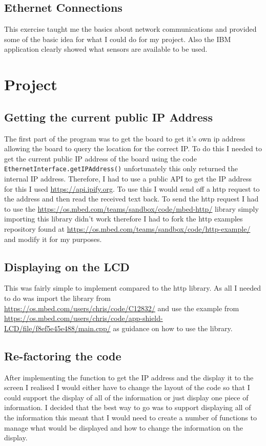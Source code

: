 \documentclass[a4paper,12pt]{scrartcl}
\begin{document}
{		\subsection{Ethernet Connections}
		{
			This exercise taught me the basics about network communications and provided some of the basic idea for what I could do for my project. Also the IBM application clearly showed what sensors are available to be used.
		}
		
	}

	\section{Project}
	{
		\subsection{Getting the current public IP Address}
		{
			The first part of the program was to get the board to get it's own ip address allowing the board to query the location for the correct IP. To do this I needed to get the current public IP address of the board using the code \lstinline|EthernetInterface.getIPAddress()| unfortunately this only returned the internal IP address. Therefore, I had to use a public API to get the IP address for this I used \url{https://api.ipify.org}\cite{Degges}. To use this I would send off a http request to the address and then read the received text back. To send the http request I had to use the \url{https://os.mbed.com/teams/sandbox/code/mbed-http/} library simply importing this library didn't work therefore I had to fork the http examples repository found at \url{https://os.mbed.com/teams/sandbox/code/http-example/} and modify it for my purposes.
		}
		\subsection{Displaying on the LCD}
		{
			This was fairly simple to implement compared to the http library. As all I needed to do was import the library from \url{https://os.mbed.com/users/chris/code/C12832/} and use the example from \url{https://os.mbed.com/users/chris/code/app-shield-LCD/file/f8ef5e45e488/main.cpp/} as guidance on how to use the library. 
		}
		\subsection{Re-factoring the code}
		{
			After implementing the function to get the IP address and the display it to the screen I realised I would either have to change the layout of the code so that I could support the display of all of the information or just display one piece of information. I decided that the best way to go was to support displaying all of the information this meant that I would need to create a number of functions to manage what would be displayed and how to change the information on the display.
		}
}
\end{document}
